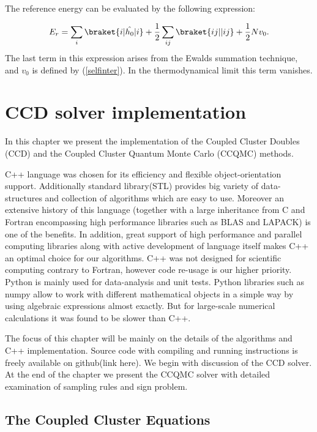 \documentclass[twoside,english]{uiofysmaster}
\begin{document}
The reference energy can be evaluated by the following expression:

\begin{equation}
	E_r = \sum_i \braket{i|\hat{h_0}|i} + \frac{1}{2}\sum_{ij}\braket{ij||ij} + \frac{1}{2}Nv_0.
\end{equation}
The last term in this expression arises from the Ewalds summation technique, and $v_0$ is defined by (\ref{selfinter}). In the thermodynamical limit this term vanishes.

\chapter{CCD solver implementation}\label{Implementchapter}

In this chapter we present the implementation of the Coupled Cluster Doubles (CCD) and the Coupled Cluster Quantum Monte Carlo (CCQMC) methods.

C++ language was chosen for its efficiency and flexible object-orientation support. 
Additionally standard library(STL) provides big variety of data-structures and collection of algorithms which are easy to use. Moreover an extensive history of this language (together with a large inheritance from C and Fortran encompassing high performance libraries such as BLAS and LAPACK) is one of the benefits. 
In addition, great support of high performance and parallel computing libraries along with active development of language itself makes C++ an optimal choice for our algorithms.
C++ was not designed for scientific computing\cite{Stroustrupprogramminglanguage2013} contrary to Fortran, however code re-usage is our higher priority. 
Python is mainly used for data-analysis and unit tests. Python libraries such as numpy allow to work with different mathematical objects in a simple way by using algebraic expressions almost exactly. But for large-scale numerical calculations it was found to be slower than C++.  

The focus of this chapter will be mainly on the details of the algorithms and C++ implementation. Source code with compiling and running instructions is freely available on github(link here).
We begin with discussion of the CCD solver. At the end of the chapter we present the CCQMC solver with detailed examination of sampling rules and sign problem.



\section{The Coupled Cluster Equations}
\end{document}
